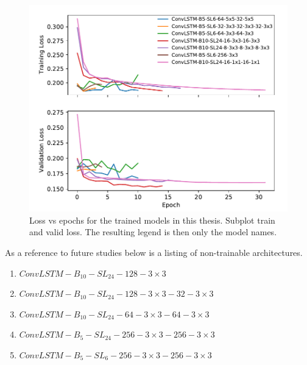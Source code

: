 \begin{figure}
    \centering
    \includegraphics{python_figs/test_epoch_loss.pdf}
    \caption{Loss vs epochs for the trained models in this thesis. Subplot train and valid loss. The resulting legend is then only the model names.}
    \label{fig:convlstm_loss}
\end{figure}
As a reference to future studies below is a listing of non-trainable architectures.
\begin{enumerate}
    \item $ConvLSTM-B_{10}-SL_{24}-128-3\times3$
    \item $ConvLSTM-B_{10}-SL_{24}-128-3\times3-32-3\times3$
    \item $ConvLSTM-B_{10}-SL_{24}-64-3\times3-64-3\times3$
    \item $ConvLSTM-B_{5}-SL_{24}-256-3\times3-256-3\times3$
    \item $ConvLSTM-B_{5}-SL_{6}-256-3\times3-256-3\times3$
\end{enumerate}

